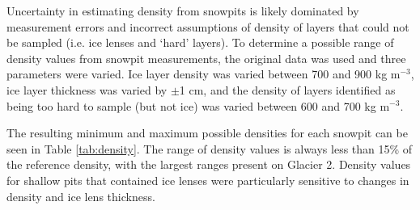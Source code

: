 \documentclass[12pt]{article}
\begin{document}
Uncertainty in estimating density from snowpits is likely dominated by measurement errors and incorrect assumptions of density of layers that could not be sampled (i.e. ice lenses and `hard' layers). To determine a possible range of density values from snowpit measurements, the original data was used and three parameters were varied. Ice layer density was varied between 700 and 900 kg m$^{-3}$, ice layer thickness was varied by $\pm$1 cm, and the density of layers identified as being too hard to sample (but not ice) was varied between 600 and 700 kg m$^{-3}$. 

The resulting minimum and maximum possible densities for each snowpit can be seen in Table \ref{tab:density}. The range of density values is always less than 15\% of the reference density, with the largest ranges present on Glacier 2. Density values for shallow pits that contained ice lenses were particularly sensitive to changes in density and ice lens thickness. 

\begin{table}[]
\centering
\caption{Summary of assumed and range of integrated snow density calculated in snowpits. The assumed density values arose from taking a density of 917 kg m$^{-3}$ was applied to ice layers and a density of 600 kg m$^{-3}$ was applied to layers that were described as `hard' and were too difficult to sample. To determine the error in estimating integrated snow density, the values of ice density, ice thickness, and the `hard' layer density was varied between 700 and 917 kg m$^{-3}$, $\pm$ 1 cm, and 500 and 600 kg m$^{-3}$, respectively.}
\label{tab:density}
\end{table}
\end{document}
